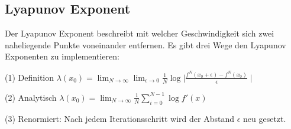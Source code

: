\documentclass{scrartcl}
\begin{document}
\subsection{Lyapunov Exponent}
Der Lyapunov Exponent beschreibt mit welcher Geschwindigkeit sich zwei naheliegende Punkte voneinander entfernen. 
Es gibt drei Wege den Lyapunov Exponenten zu implementieren:

(1) Definition
$\lambda(x_0) = \lim_{N \rightarrow \infty}\lim_{\epsilon \rightarrow 0} \frac{1}{N}\log{\mid \frac{f^N(x_0+\epsilon)- f^N(x_0)}{\epsilon} \mid} $


(2) Analytisch
$\lambda(x_0) = \lim_{N \rightarrow \infty} \frac{1}{N} \sum_{i=0}^{N-1}  \log{f'(x)} $


(3) Renormiert:
Nach jedem Iterationsschritt wird der Abstand $\epsilon$ neu gesetzt. \newline
\end{document}
